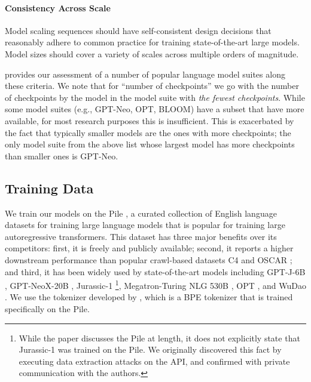 \documentclass{article}
\theoremstyle{plain}
\theoremstyle{definition}
\theoremstyle{remark}
\begin{document}
\paragraph{Consistency Across Scale} Model scaling sequences should have self-consistent design decisions that reasonably adhere to common practice for training state-of-the-art large models. Model sizes should cover a variety of scales across multiple orders of magnitude.

 provides our assessment of a number of popular language model suites along these criteria. We note that for ``number of checkpoints'' we go with the number of checkpoints by the model in the model suite with \textit{the fewest checkpoints}. While some model suites (e.g., GPT-Neo, OPT, BLOOM) have a subset that have more available, for most research purposes this is insufficient. This is exacerbated by the fact that typically smaller models are the ones with more checkpoints; the only model suite from the above list whose largest model has more checkpoints than smaller ones is GPT-Neo.

\subsection{Training Data}

We train our models on the Pile \citep{gao2020pile,biderman2022datasheet}, a curated collection of English language datasets for training large language models that is popular for training large autoregressive transformers. This dataset has three major benefits over its competitors: first, it is freely and publicly available; second, it reports a higher downstream performance \citep{le2022language} than popular crawl-based datasets C4 \citep{raffel2020exploring,dodge2021documenting} and OSCAR \citep{OSCAR}; and third, it has been widely used by state-of-the-art models including \mbox{GPT-J-6B} \citep{gpt-j}, \mbox{GPT-NeoX-20B} \citep{black2022gpt}, \mbox{Jurassic-1} \citep{lieber2021jurassic}\footnote{While the paper discusses the Pile at length, it does not explicitly state that Jurassic-1 was trained on the Pile. We originally discovered this fact by executing data extraction attacks on the API, and confirmed with private communication with the authors.}, Megatron-Turing NLG 530B \citep{Megatron-Turing}, OPT \citep{zhang2022opt}, and WuDao \citep{WuDao}. We use the tokenizer developed by \citet{black2022gpt}, which is a BPE tokenizer that is trained specifically on the Pile.
\end{document}
